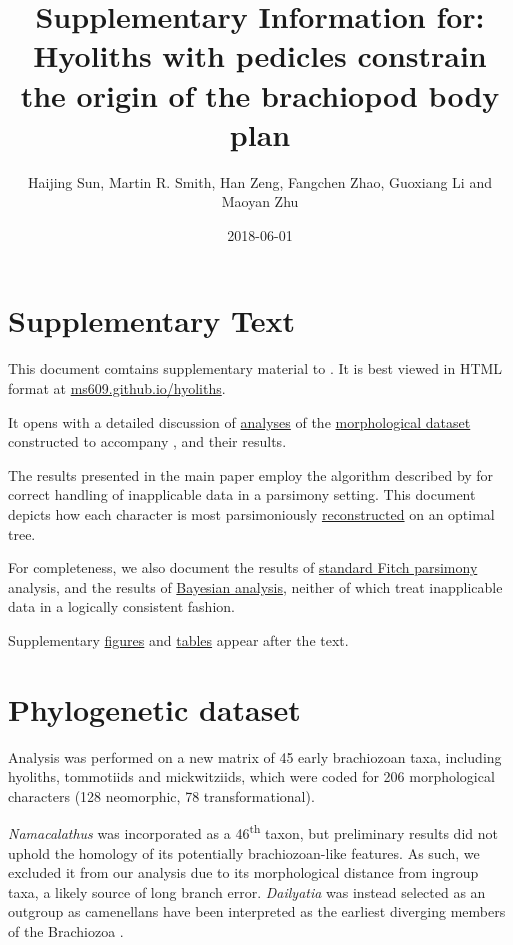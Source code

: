 \documentclass[openany]{book}
\title{Supplementary Information for: \newline\newline Hyoliths with pedicles
constrain the origin of the brachiopod body plan}
\author{Haijing Sun, Martin R. Smith, Han Zeng, Fangchen Zhao, Guoxiang Li and
Maoyan Zhu}
\date{2018-06-01}
\theoremstyle{definition}
\theoremstyle{definition}
\theoremstyle{definition}
\theoremstyle{remark}
\begin{document}
\maketitle

{
\setcounter{tocdepth}{1}
\tableofcontents
}
\chapter*{Supplementary Text}\label{supplementary-text}

This document comtains supplementary material to
\citet{Sun2018Hyolithswith}. It is best viewed in HTML format at
\href{https://ms609.github.io/hyoliths/}{ms609.github.io/hyoliths}.

It opens with a detailed discussion of
\protect\hyperlink{treesearch}{analyses} of the
\protect\hyperlink{dataset}{morphological dataset} constructed to
accompany \citet{Sun2018Hyolithswith}, and their results.

The results presented in the main paper employ the algorithm described
by \citet{Brazeau2018} for correct handling of inapplicable data in a
parsimony setting. This document depicts how each character is most
parsimoniously \protect\hyperlink{reconstructions}{reconstructed} on an
optimal tree.

For completeness, we also document the results of
\protect\hyperlink{fitch}{standard Fitch parsimony} analysis, and the
results of \protect\hyperlink{bayesian}{Bayesian analysis}, neither of
which treat inapplicable data in a logically consistent fashion.

Supplementary \protect\hyperlink{figures}{figures} and
\protect\hyperlink{table}{tables} appear after the text.

\hypertarget{dataset}{\chapter{Phylogenetic dataset}\label{dataset}}

Analysis was performed on a new matrix of 45 early brachiozoan taxa,
including hyoliths, tommotiids and mickwitziids, which were coded for
206 morphological characters (128 neomorphic, 78 transformational).

\emph{Namacalathus} was incorporated as a 46\textsuperscript{th} taxon,
but preliminary results did not uphold the homology of its potentially
brachiozoan-like features. As such, we excluded it from our analysis due
to its morphological distance from ingroup taxa, a likely source of long
branch error. \emph{Dailyatia} was instead selected as an outgroup as
camenellans have been interpreted as the earliest diverging members of
the Brachiozoa \citep{Skovsted2015Theearly, Zhao2017}.
\end{document}
